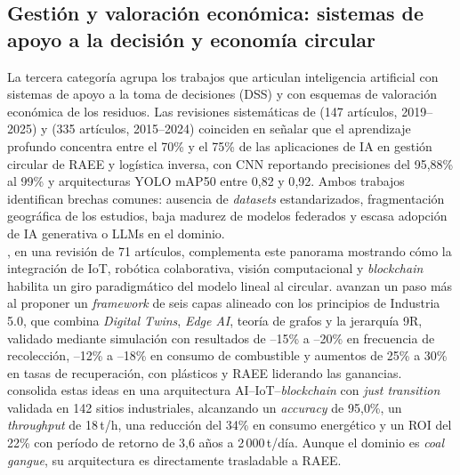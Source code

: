 \subsection{Gestión y valoración económica: sistemas de apoyo a la decisión y economía circular}

La tercera categoría agrupa los trabajos que articulan inteligencia artificial con sistemas de apoyo a la toma de decisiones (DSS) y con esquemas de valoración económica de los residuos. Las revisiones sistemáticas de \cite{janoClosingLoopSystematic2026} (147 artículos, 2019--2025) y \cite{dehabadi_how_2026} (335 artículos, 2015--2024) coinciden en señalar que el aprendizaje profundo concentra entre el 70\% y el 75\% de las aplicaciones de IA en gestión circular de RAEE y logística inversa, con CNN reportando precisiones del 95{,}88\% al 99\% y arquitecturas YOLO mAP50 entre 0{,}82 y 0{,}92. Ambos trabajos identifican brechas comunes: ausencia de \textit{datasets} estandarizados, fragmentación geográfica de los estudios, baja madurez de modelos federados y escasa adopción de IA generativa o LLMs en el dominio.\\

\cite{olawadeSmartWasteManagement2024}, en una revisión de 71 artículos, complementa este panorama mostrando cómo la integración de IoT, robótica colaborativa, visión computacional y \textit{blockchain} habilita un giro paradigmático del modelo lineal al circular. \cite{anithaSmartWasteEcosystems2025} avanzan un paso más al proponer un \textit{framework} de seis capas alineado con los principios de Industria 5.0, que combina \textit{Digital Twins}, \textit{Edge AI}, teoría de grafos y la jerarquía 9R, validado mediante simulación con resultados de --15\% a --20\% en frecuencia de recolección, --12\% a --18\% en consumo de combustible y aumentos de 25\% a 30\% en tasas de recuperación, con plásticos y RAEE liderando las ganancias. \cite{stephenSmartAIIoTBlockchain2026} consolida estas ideas en una arquitectura AI--IoT--\textit{blockchain} con \textit{just transition} validada en 142 sitios industriales, alcanzando un \textit{accuracy} de 95{,}0\%, un \textit{throughput} de 18\,t/h, una reducción del 34\% en consumo energético y un ROI del 22\% con período de retorno de 3{,}6 años a 2\,000\,t/día. Aunque el dominio es \textit{coal gangue}, su arquitectura es directamente trasladable a RAEE.\\

